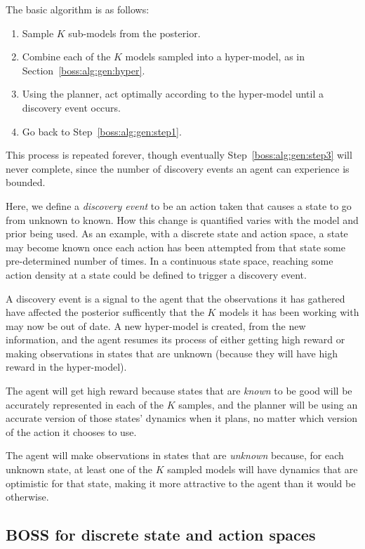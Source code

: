 The basic  algorithm is as follows:
\begin{enumerate}
\item Sample $K$ sub-models from the posterior. \label{boss:alg:gen:step1}
\item Combine each of the $K$ models sampled into a hyper-model, as in Section~\ref{boss:alg:gen:hyper}.
\item Using the planner, act optimally according to the hyper-model until a discovery event occurs. \label{boss:alg:gen:step3}
\item Go back to Step~\ref{boss:alg:gen:step1}.
\end{enumerate}

This process is repeated forever, though eventually Step~\ref{boss:alg:gen:step3} will never complete, since the number of discovery events an agent can experience is bounded.

Here, we define a \emph{discovery event} to be an action taken that causes a state to go from unknown to known. How this change is quantified varies with the model and prior being used. As an example, with a discrete state and action space, a state may become known once each action has been attempted from that state some pre-determined number of times. In a continuous state space, reaching some action density at a state could be defined to trigger a discovery event.

A discovery event is a signal to the agent that the observations it has gathered have affected the posterior sufficently that the $K$ models it has been working with may now be out of date. A new hyper-model is created, from the new information, and the agent resumes its process of either getting high reward or making observations in states that are unknown (because they will have high reward in the hyper-model).

The agent will get high reward because states that are \emph{known} to be good will be accurately represented in each of the $K$ samples, and the planner will be using an accurate version of those states' dynamics when it plans, no matter which version of the action it chooses to use.

The agent will make observations in states that are \emph{unknown} because, for each unknown state, at least one of the $K$ sampled models will have dynamics that are optimistic for that state, making it more attractive to the agent than it would be otherwise.

\subsection{BOSS for discrete state and action spaces}
\label{boss:alg:disc}

